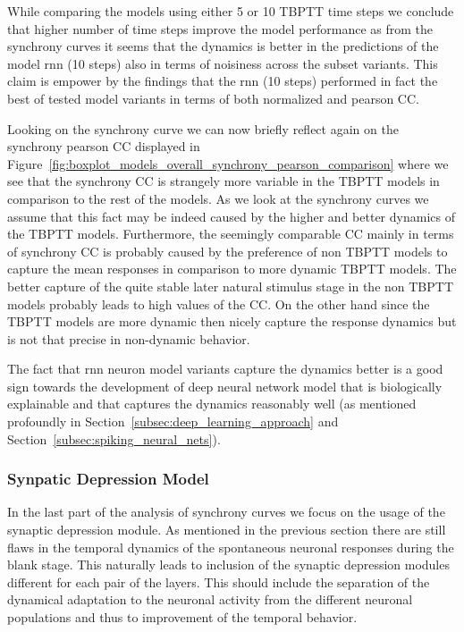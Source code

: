 While comparing the models using either 5 or 10 TBPTT time steps we conclude that higher number of time steps improve the model performance as from the synchrony curves it seems that the dynamics is better in the predictions of the model rnn (10 steps) also in terms of noisiness across the subset variants. This claim is empower by the findings that the rnn (10 steps) performed in fact the best of tested model variants in terms of both normalized and pearson CC.

Looking on the synchrony curve we can now briefly reflect again on the synchrony pearson CC displayed in Figure~\ref{fig:boxplot_models_overall_synchrony_pearson_comparison} where we see that the synchrony CC is strangely more variable in the TBPTT models in comparison to the rest of the models. As we look at the synchrony curves we assume that this fact may be indeed caused by the higher and better dynamics of the TBPTT models. Furthermore, the seemingly comparable CC mainly in terms of synchrony CC is probably caused by the preference of non TBPTT models to capture the mean responses in comparison to more dynamic TBPTT models. The better capture of the quite stable later natural stimulus stage in the non TBPTT models probably leads to high values of the CC. On the other hand since the TBPTT models are more dynamic then nicely capture the response dynamics but is not that precise in non-dynamic behavior.

The fact that rnn neuron model variants capture the dynamics better is a good sign towards the development of deep neural network model that is biologically explainable and that captures the dynamics reasonably well (as mentioned profoundly in Section~\ref{subsec:deep_learning_approach} and Section~\ref{subsec:spiking_neural_nets}).

\subsubsection{Synpatic Depression Model}
\label{{subsubsec:syn_adap_lgn_5}}
In the last part of the analysis of synchrony curves we focus on the usage of the synaptic depression module. As mentioned in the previous section there are still flaws in the temporal dynamics of the spontaneous neuronal responses during the blank stage. This naturally leads to inclusion of the synaptic depression modules different for each pair of the layers. This should include the separation of the dynamical adaptation to the neuronal activity from the different neuronal populations and thus to improvement of the temporal behavior.


